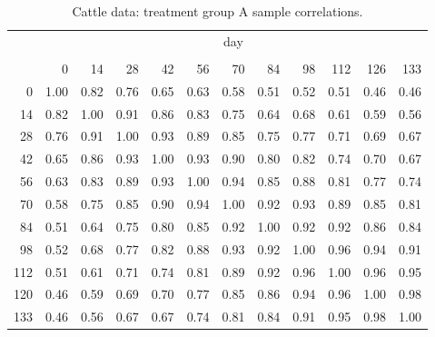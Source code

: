 \begin{table}[H] 
\begin{center}
\begin{tabular}{r|rrrrrrrrrrr}
& \multicolumn{11}{c}{day}\\
&&&&&&&&&&\\
& 0 & 14 & 28 & 42 & 56 & 70 & 84 & 98& 112& 126 &133\\
  \hline\noalign{\smallskip} 
0 & 1.00 & 0.82 & 0.76 & 0.65 & 0.63 & 0.58 & 0.51 & 0.52 & 0.51 & 0.46 & 0.46 \\ 
  14 & 0.82 & 1.00 & 0.91 & 0.86 & 0.83 & 0.75 & 0.64 & 0.68 & 0.61 & 0.59 & 0.56 \\ 
  28 & 0.76 & 0.91 & 1.00 & 0.93 & 0.89 & 0.85 & 0.75 & 0.77 & 0.71 & 0.69 & 0.67 \\ 
  42 & 0.65 & 0.86 & 0.93 & 1.00 & 0.93 & 0.90 & 0.80 & 0.82 & 0.74 & 0.70 & 0.67 \\ 
  56 & 0.63 & 0.83 & 0.89 & 0.93 & 1.00 & 0.94 & 0.85 & 0.88 & 0.81 & 0.77 & 0.74 \\ 
  70 & 0.58 & 0.75 & 0.85 & 0.90 & 0.94 & 1.00 & 0.92 & 0.93 & 0.89 & 0.85 & 0.81 \\ 
  84 & 0.51 & 0.64 & 0.75 & 0.80 & 0.85 & 0.92 & 1.00 & 0.92 & 0.92 & 0.86 & 0.84 \\ 
  98 & 0.52 & 0.68 & 0.77 & 0.82 & 0.88 & 0.93 & 0.92 & 1.00 & 0.96 & 0.94 & 0.91 \\ 
  112 & 0.51 & 0.61 & 0.71 & 0.74 & 0.81 & 0.89 & 0.92 & 0.96 & 1.00 & 0.96 & 0.95 \\ 
  120 & 0.46 & 0.59 & 0.69 & 0.70 & 0.77 & 0.85 & 0.86 & 0.94 & 0.96 & 1.00 & 0.98 \\ 
  133 & 0.46 & 0.56 & 0.67 & 0.67 & 0.74 & 0.81 & 0.84 & 0.91 & 0.95 & 0.98 & 1.00 \\ 
   \hline
\end{tabular}
\caption{Cattle data: treatment group A sample correlations.}\label{table:cattleA-sample-correlations}
\end{center}
\end{table}


